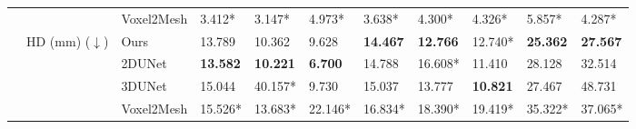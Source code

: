 \documentclass[times,review,preprint,authoryear]{elsarticle}
\begin{document}
\begin{table}[H]
{\begin{tabular}{llllllllll|l}
   &         & Voxel2Mesh &   3.412* &   3.147* &   4.973* &   3.638* &   4.300* &   4.326* &   5.857* &   4.287* \\
\cline{2-11}
   & \multirow{4}{*}{HD (mm) ($\downarrow$)} & Ours &  13.789 &  10.362 &   9.628 &  \textbf{14.467} &  \textbf{12.766} &  12.740* & \textbf{ 25.362} & \textbf{ 27.567} \\
   &         & 2DUNet &  \textbf{13.582} &  \textbf{10.221} &   \textbf{6.700} &  14.788 &  16.608* &  11.410 &  28.128&  32.514 \\
   &         & 3DUNet &  15.044 &  40.157* &   9.730 &  15.037 &  13.777 &  \textbf{10.821} &  27.467 &  48.731\\
   &         & Voxel2Mesh &  15.526* &  13.683* &  22.146* &  16.834* &  18.390* &  19.419* &  35.322* &  37.065* \\


\end{tabular}}
\end{table}
\end{document}
